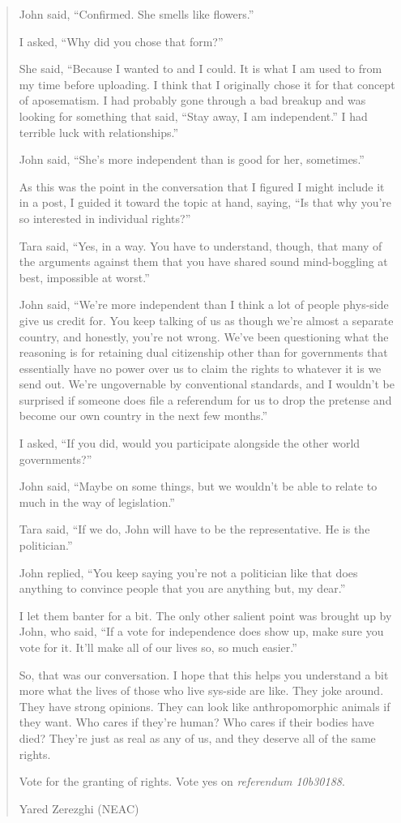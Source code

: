 \begin{quote}
John said, ``Confirmed. She smells like flowers.''

I asked, ``Why did you chose that form?''

She said, ``Because I wanted to and I could. It is what I am used to from my time before uploading. I think that I originally chose it for that concept of aposematism. I had probably gone through a bad breakup and was looking for something that said, ``Stay away, I am independent.'' I had terrible luck with relationships.''

John said, ``She's more independent than is good for her, sometimes.''

As this was the point in the conversation that I figured I might include it in a post, I guided it toward the topic at hand, saying, ``Is that why you're so interested in individual rights?''

Tara said, ``Yes, in a way. You have to understand, though, that many of the arguments against them that you have shared sound mind-boggling at best, impossible at worst.''

John said, ``We're more independent than I think a lot of people phys-side give us credit for. You keep talking of us as though we're almost a separate country, and honestly, you're not wrong. We've been questioning what the reasoning is for retaining dual citizenship other than for governments that essentially have no power over us to claim the rights to whatever it is we send out. We're ungovernable by conventional standards, and I wouldn't be surprised if someone does file a referendum for us to drop the pretense and become our own country in the next few months.''

I asked, ``If you did, would you participate alongside the other world governments?''

John said, ``Maybe on some things, but we wouldn't be able to relate to much in the way of legislation.''

Tara said, ``If we do, John will have to be the representative. He is the politician.''

John replied, ``You keep saying you're not a politician like that does anything to convince people that you are anything but, my dear.''

I let them banter for a bit. The only other salient point was brought up by John, who said, ``If a vote for independence does show up, make sure you vote for it. It'll make all of our lives so, so much easier.''

So, that was our conversation. I hope that this helps you understand a bit more what the lives of those who live sys-side are like. They joke around. They have strong opinions. They can look like anthropomorphic animals if they want. Who cares if they're human? Who cares if their bodies have died? They're just as real as any of us, and they deserve all of the same rights.

Vote for the granting of rights. Vote yes on \emph{referendum 10b30188}.

Yared Zerezghi (NEAC)
\end{quote}

